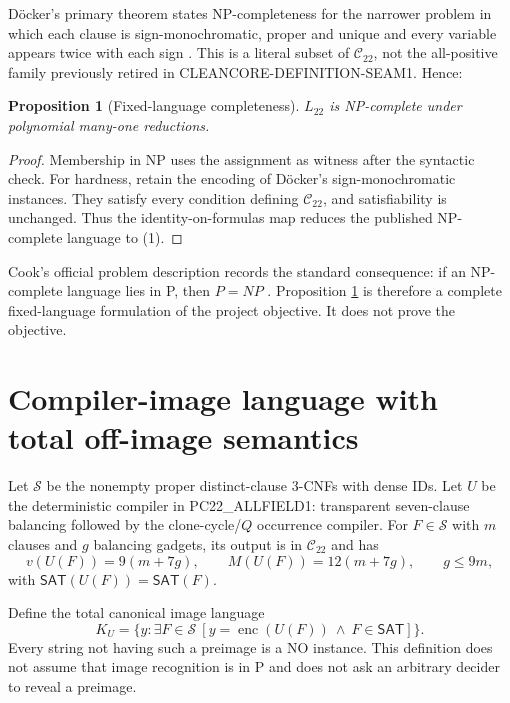 \documentclass[11pt]{article}
\newtheorem{proposition}[theorem]{Proposition}
\newcommand{\SAT}{\mathsf{SAT}}
\newcommand{\Ctwo}{\mathcal C_{22}}
\newcommand{\Ltwo}{L_{22}}
\begin{document}
D\"ocker's primary theorem states NP-completeness for the narrower problem in
which each clause is sign-monochromatic, proper and unique and every variable
appears twice with each sign \cite{Docker}.  This is a literal subset of
$\Ctwo$, not the all-positive family previously retired in
CLEANCORE-DEFINITION-SEAM1.  Hence:

\begin{proposition}[Fixed-language completeness]\label{prop:l22}
$\Ltwo$ is NP-complete under polynomial many-one reductions.
\end{proposition}
\begin{proof}
Membership in NP uses the assignment as witness after the syntactic check.
For hardness, retain the encoding of D\"ocker's sign-monochromatic instances.
They satisfy every condition defining $\Ctwo$, and satisfiability is unchanged.
Thus the identity-on-formulas map reduces the published NP-complete language
to (1).
\end{proof}

Cook's official problem description records the standard consequence: if an
NP-complete language lies in P, then $P=NP$ \cite{Cook}.  Proposition
\ref{prop:l22} is therefore a complete fixed-language formulation of the
project objective.  It does not prove the objective.

\section{Compiler-image language with total off-image semantics}
Let $\mathcal S$ be the nonempty proper distinct-clause 3-CNFs with dense IDs.
Let $U$ be the deterministic compiler in PC22\_ALLFIELD1: transparent
seven-clause balancing followed by the clone-cycle/$Q$ occurrence compiler.
For $F\in\mathcal S$ with $m$ clauses and $g$ balancing gadgets, its output is
in $\Ctwo$ and has
\[
 v(U(F))=9(m+7g),\qquad M(U(F))=12(m+7g),\qquad g\le9m,
 \tag{2}
\]
with $\SAT(U(F))=\SAT(F)$.

Define the total canonical image language
\[
 K_U=\{y:\exists F\in\mathcal S\ [y=\operatorname{enc}(U(F))
       \ \wedge\ F\in\SAT]\}.                                  \tag{3}
\]
Every string not having such a preimage is a NO instance.  This definition
does not assume that image recognition is in P and does not ask an arbitrary
decider to reveal a preimage.
\end{document}
